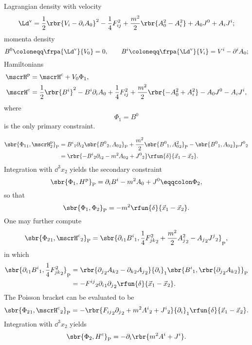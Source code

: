 \documentclass[a4paper,11pt]{article}
\begin{document}
Lagrangian density with velocity
\begin{equation}
\Ld^\text{v} = \frac{1}{2} \rbr{V_i - \partial_i A_0}^2 - \frac{1}{4} F_{ij}^2 
+ \frac{m^2}{2} \rbr{A_0^2 - A_i^2} + A_0 J^0 + A_i J^i;
\end{equation}
momenta density
\begin{equation}
B^0 \coloneqq \frpa{\Ld^\text{v}}{V_0} = 0,\qquad
B^i \coloneqq \frpa{\Ld^\text{v}}{V_i} = V^i - \partial^i A_0;
\end{equation}
Hamiltonians
\begin{align}
\mscrH^\text{p} &= \mscrH^\text{c} + V_0 \Phi_1,\\
\mscrH^\text{c} &= \frac{1}{2} \rbr{B^i}^2 - B^i \partial_i A_0 + \frac{1}{4} 
F_{ij}^2 + \frac{m^2}{2} \rbr{-A_0^2 + A_i^2} - A_0 J^0 - A_i J^i,\\
\end{align}
where
\begin{equation}
\Phi_1 = B^0
\end{equation}
is the only primary constraint.


\begin{align}
\sbr{{\Phi_1}_1,{\mscrH^\text{p}_2}}_\text{P} &=
{B^i}_1 {\partial_i}_2 \sbr{{B^0}_2, {A_0}_2}_\text{P} +
\frac{m^2}{2}\sbr{{B^0}_1, {A_0^2}_2}_\text{P} -
\sbr{{B^0}_1, {A_0}_2}_\text{P} {J^0}_2 \nonumber \\
&= \rbr{-{B^i}_2 {\partial_i}_2 - m^2 {A_0}_2 + {J^0}_2}
\rfun{\delta}{\vec{x}_1 - \vec{x}_2}.
\end{align}
Integration with $\dd^3 x_2$ yields the secondary constraint
\begin{equation}
\sbr{\Phi_1, H^\text{p}}_\text{P} = \partial_i B^i - m^2 A_0 + J^0 
\eqqcolon \Phi_2,
\end{equation}
so that
\begin{equation}
\sbr{\Phi_1,\Phi_2}_\text{P} = -m^2\rfun{\delta}{\vec{x}_1-\vec{x}_2}.
\label{eq:Maxwell-Proca-Q}
\end{equation}
One may further compute
\begin{equation}
\sbr{{\Phi_2}_1, {\mscrH^\text{c}}_2}_\text{P} = \sbr{{\partial_i}_1 {B^i}_1,
\frac{1}{4} {F_{jk}^2}_2 + \frac{m^2}{2} {A_j^2}_2 - {A_j}_2 {J^j}_2}_\text{P},
\end{equation}
in which
\begin{align}
\sbr{{\partial_i}_1 {B^i}_1, \frac{1}{4} {F_{jk}^2}_2}_\text{P} &=
\rbr{{\partial_j}_2 {A_k}_2 - {\partial_k}_2 {A_j}_2}
{\partial_i}_1 \sbr{{B^i}_1, \rbr{{\partial_j}_2 {A_k}_2}}_\text{P} \nonumber \\
&= -{F^{ij}}_2 {\partial_i}_1{\partial_j}_2\rfun{\delta}{\vec{x}_1-\vec{x}_2}.
\end{align}
The Poisson bracket can be evaluated to be
\begin{equation}
\sbr{{\Phi_2}_1, {\mscrH^\text{c}}_2}_\text{P} =
-\rbr{{F_{ij}}_2 {\partial_j}_2 + m^2 {A^i}_2 + {J^i}_2}
{\partial_i}_1\rfun{\delta}{\vec{x}_1-\vec{x}_2}.
\end{equation}
Integration with $\dd^3 x_2$ yields
\begin{equation}
\sbr{\Phi_2, H^\text{c}}_\text{P} = -\partial_i\rbr{m^2 A^i + J^i}.
\end{equation}
\end{document}
